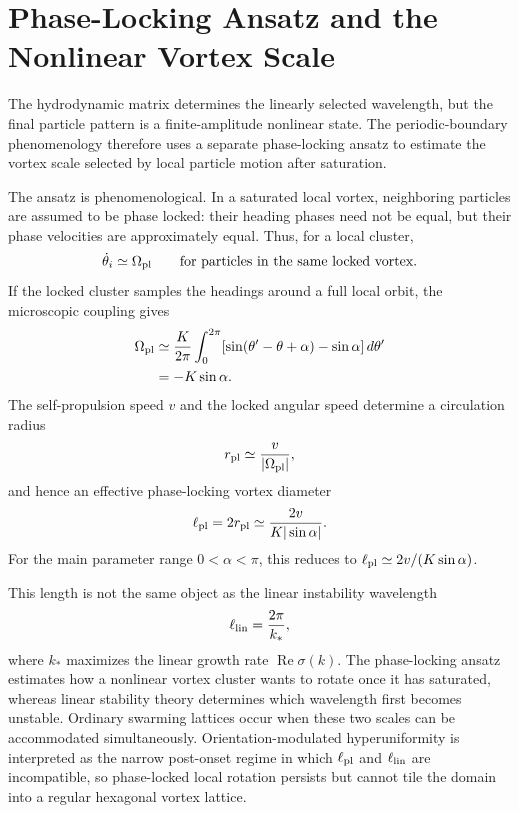 \documentclass[11pt]{article}
\numberwithin{equation}{section}
\begin{document}
\section{Phase-Locking Ansatz and the Nonlinear Vortex Scale}

The hydrodynamic matrix determines the linearly selected wavelength, but
the final particle pattern is a finite-amplitude nonlinear state. The
periodic-boundary phenomenology therefore uses a separate
phase-locking ansatz to estimate the vortex scale selected by local
particle motion after saturation.

The ansatz is phenomenological. In a saturated local vortex, neighboring
particles are assumed to be phase locked: their heading phases need not
be equal, but their phase velocities are approximately equal. Thus, for a
local cluster,
\begin{equation}
  \dot\theta_i\simeq\Omega_{\rm pl}
  \qquad
  \text{for particles in the same locked vortex.}
\end{equation}
If the locked cluster samples the headings around a full local orbit, the
microscopic coupling gives
\begin{align}
  \Omega_{\rm pl}
  &\simeq
  \frac{K}{2\pi}\int_0^{2\pi}
  [\sin(\theta'-\theta+\alpha)-\sin\alpha]\,d\theta'
  \nonumber\\
  &=-K\sin\alpha .
  \label{eq:phase_locking_frequency_appendix}
\end{align}
The self-propulsion speed $v$ and the locked angular speed determine a
circulation radius
\begin{equation}
  r_{\rm pl}\simeq \frac{v}{|\Omega_{\rm pl}|},
\end{equation}
and hence an effective phase-locking vortex diameter
\begin{equation}
  \ell_{\rm pl}=2r_{\rm pl}
  \simeq
  \frac{2v}{K|\sin\alpha|}.
  \label{eq:phase_locking_length_appendix}
\end{equation}
For the main parameter range $0<\alpha<\pi$, this reduces to
$\ell_{\rm pl}\simeq2v/(K\sin\alpha)$.

This length is not the same object as the linear instability wavelength
\begin{equation}
  \ell_{\rm lin}=\frac{2\pi}{k_\ast},
\end{equation}
where $k_\ast$ maximizes the linear growth rate
$\operatorname{Re}\sigma(k)$. The phase-locking ansatz estimates how a
nonlinear vortex cluster wants to rotate once it has saturated, whereas
linear stability theory determines which wavelength first becomes
unstable. Ordinary swarming lattices occur when these two scales can be
accommodated simultaneously. Orientation-modulated hyperuniformity is
interpreted as the narrow post-onset regime in which
$\ell_{\rm pl}$ and $\ell_{\rm lin}$ are incompatible, so phase-locked
local rotation persists but cannot tile the domain into a regular
hexagonal vortex lattice.
\end{document}
